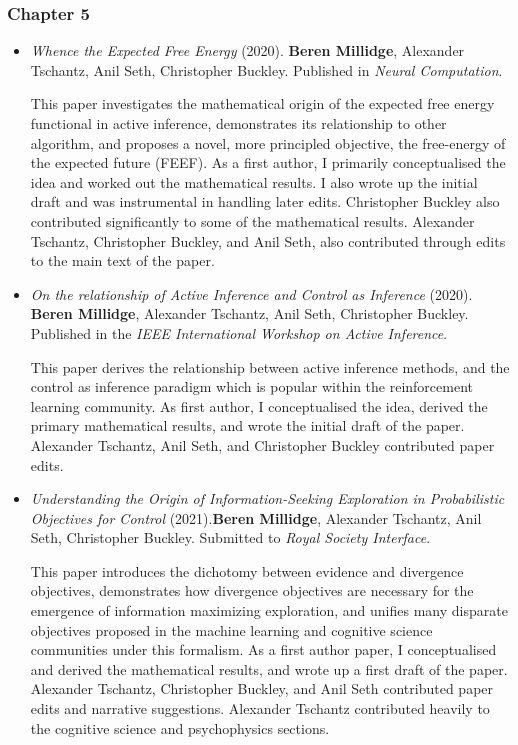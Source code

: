 \subsubsection{Chapter 5}
\begin{itemize}

\item \emph{Whence the Expected Free Energy} (2020). \textbf{Beren Millidge}, Alexander Tschantz, Anil Seth, Christopher Buckley. Published in \emph{Neural Computation}.

This paper investigates the mathematical origin of the expected free energy functional in active inference, demonstrates its relationship to other algorithm, and proposes a novel, more principled objective, the free-energy of the expected future (FEEF). As a first author, I primarily conceptualised the idea and worked out the mathematical results. I also wrote up the initial draft and was instrumental in handling later edits. Christopher Buckley also contributed significantly to some of the mathematical results. Alexander Tschantz, Christopher Buckley, and Anil Seth, also contributed through edits to the main text of the paper.

\item  \emph{On the relationship of Active Inference and Control as Inference} (2020). \textbf{Beren Millidge}, Alexander Tschantz, Anil Seth, Christopher Buckley. Published in the \emph{IEEE International Workshop on Active Inference}.

This paper derives the relationship between active inference methods, and the control as inference paradigm which is popular within the reinforcement learning community. As first author, I conceptualised the idea, derived the primary mathematical results, and wrote the initial draft of the paper. Alexander Tschantz, Anil Seth,  and Christopher Buckley contributed paper edits.

\item \emph{Understanding the Origin of Information-Seeking Exploration in Probabilistic Objectives for Control} (2021).\textbf{Beren Millidge}, Alexander Tschantz, Anil Seth, Christopher Buckley. Submitted to \emph{Royal Society Interface}. 

This paper introduces the dichotomy between evidence and divergence objectives, demonstrates how divergence objectives are necessary for the emergence of information maximizing exploration, and unifies many disparate objectives proposed in the machine learning and cognitive science communities under this formalism. As a first author paper, I conceptualised and derived the mathematical results, and wrote up a first draft of the paper. Alexander Tschantz, Christopher Buckley, and Anil Seth contributed paper edits and narrative suggestions. Alexander Tschantz contributed heavily to the cognitive science and psychophysics sections.
\end{itemize}

